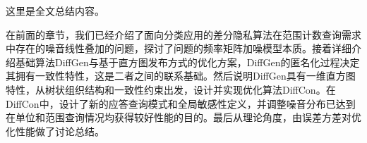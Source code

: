 
\begin{summary}

这里是全文总结内容。

在前面的章节，我们已经介绍了面向分类应用的差分隐私算法在范围计数查询需求中存在的噪音线性叠加的问题，探讨了问题的频率矩阵加噪模型本质。接着详细介绍基础算法DiffGen与基于直方图发布方式的优化方案，DiffGen的匿名化过程决定其拥有一致性特性，这是二者之间的联系基础。然后说明DiffGen具有一维直方图特性，从树状组织结构和一致性约束出发，设计并实现优化算法DiffCon。在DiffCon中，设计了新的应答查询模式和全局敏感性定义，并调整噪音分布已达到在单位和范围查询情况均获得较好性能的目的。最后从理论角度，由误差方差对优化性能做了讨论总结。    

\end{summary}
